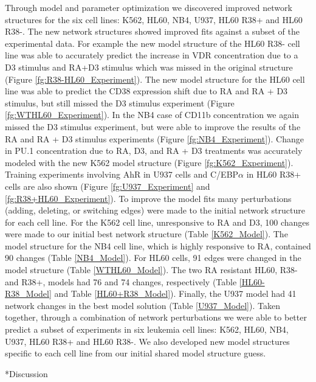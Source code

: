 \documentclass[12pt]{article}
\makeatletter
\renewcommand\section{\@startsection
	{subsection}{2}{0mm}
	{-0.2in}
	{0.05\baselineskip}
	{\normalfont\large\bfseries}}
\makeatother
\begin{document}
Through model and parameter optimization we discovered improved network structures for the six cell lines: K562, HL60, NB4, U937, HL60 R38+ and HL60 R38-. 
The new network structures showed improved fits against a subset of the experimental data. 
For example the new model structure of the HL60 R38- cell line was able to accurately predict the increase in VDR concentration due to a D3 stimulus and RA+D3 stimulus which was missed in the original structure (Figure \ref{fg:R38-HL60_Experiment}).
The new model structure for the HL60 cell line was able to predict the CD38 expression shift due to RA and RA + D3 stimulus, but still missed the D3 stimulus experiment (Figure \ref{fg:WTHL60_Experiment}).
In the NB4 case of CD11b concentration we again missed the D3 stimulus experiment, but were able to improve the results of the RA and RA + D3 stimulus experiments (Figure \ref{fg:NB4_Experiment}).
Change in PU.1 concentration due to RA, D3, and RA + D3 treatments was accurately modeled with the new K562 model structure (Figure \ref{fg:K562_Experiment}). 
Training experiments involving AhR in U937 cells and C/EBP$\alpha$ in HL60 R38+ cells are also shown (Figure \ref{fg:U937_Experiment} and \ref{fg:R38+HL60_Experiment}).
To improve the model fits many perturbations (adding, deleting, or switching edges) were made to the initial network structure for each cell line.
For the K562 cell line, unresponsive to RA and D3, 100 changes were made to our initial best network structure (Table \ref{K562_Model}). 
The model structure for the NB4 cell line, which is highly responsive to RA, contained 90 changes (Table \ref{NB4_Model}).
For HL60 cells, 91 edges were changed in the model structure (Table \ref{WTHL60_Model}).
The two RA resistant HL60, R38- and R38+, models had 76 and 74 changes, respectively (Table \ref{HL60-R38_Model} and Table \ref{HL60+R38_Model}).
Finally, the U937 model had 41 network changes in the best model solution (Table \ref{U937_Model}).
Taken together, through a combination of network perturbations we were able to better predict a subset of experiments in six leukemia cell lines: K562, HL60, NB4, U937, HL60 R38+ and HL60 R38-. 
We also developed new model structures specific to each cell line from our initial shared model structure guess.


\section*{Discussion}
\end{document}
